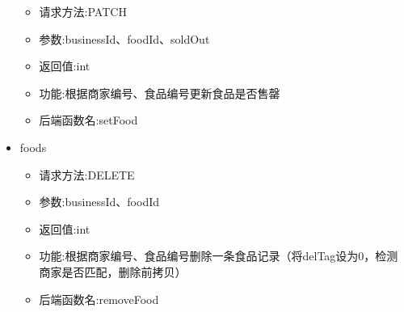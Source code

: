 \begin{itemize}
    \begin{itemize}
    \item 请求方法:PATCH
    \item 参数:businessId、foodId、soldOut
    \item 返回值:int
    \item 功能:根据商家编号、食品编号更新食品是否售罄
    \item 后端函数名:setFood
   \end{itemize}
    \item foods
    \begin{itemize}
    \item 请求方法:DELETE
    \item 参数:businessId、foodId
    \item 返回值:int
    \item 功能:根据商家编号、食品编号删除一条食品记录（将delTag设为0，检测商家是否匹配，删除前拷贝）
    \item 后端函数名:removeFood
    \end{itemize}
\end{itemize}


